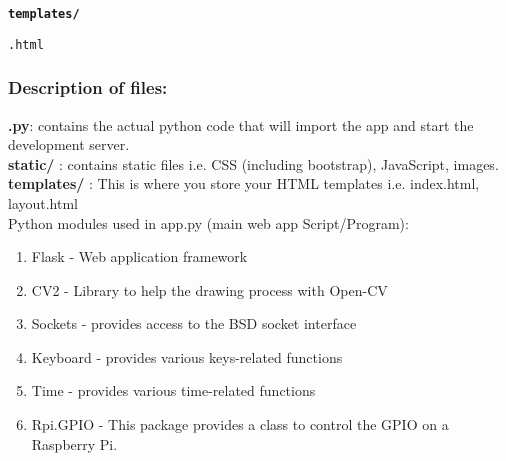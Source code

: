 \textbf{\texttt{\small{templates/}}}

\hspace{0.5in}\texttt{\small{.html}}

\subsubsection*{Description of files:}
\textbf{.py}: contains the actual python code that will import the app
and start the \\development server.\\
\textbf{static/} : contains static files i.e. CSS (including bootstrap), JavaScript, images.\\
\textbf{templates/} : This is where you store your HTML templates
i.e. index.html, \\layout.html\\
Python modules used in app.py (main web app Script/Program):
\begin{enumerate}[1.]
\item Flask - Web application framework
\item CV2 - Library to help the drawing process with Open-CV
\item Sockets - provides access to the BSD socket interface
\item Keyboard - provides various keys-related functions
\item Time - provides various time-related functions
\item Rpi.GPIO - This package provides a class to control the GPIO on a Raspberry Pi.
\end{enumerate}

